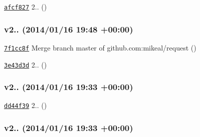 \begin{DoxyItemize}
\item \href{https://github.com/mikeal/request/commit/afcf827559b3223c96ac1bbd19bd1e4a6d7771e3}{\tt afcf827} 2.. ()
\end{DoxyItemize}

\subsubsection*{v2.. (2014/01/16 19\+:48 +00\+:00)}


\begin{DoxyItemize}
\item \href{https://github.com/mikeal/request/commit/7f1cc8ff5a8d9443e7a793f4655487e722b75b0d}{\tt 7f1cc8f} Merge branch \textquotesingle{}master\textquotesingle{} of github.\+com\+:mikeal/request ()
\item \href{https://github.com/mikeal/request/commit/3e43d3d5175f5f18d1e97b2f5d4ca6ac6c216e4a}{\tt 3e43d3d} 2.. ()
\end{DoxyItemize}

\subsubsection*{v2.. (2014/01/16 19\+:33 +00\+:00)}


\begin{DoxyItemize}
\item \href{https://github.com/mikeal/request/commit/dd44f39d37daacbbeb21f9e960f13adbb44eea0a}{\tt dd44f39} 2.. ()
\end{DoxyItemize}

\subsubsection*{v2.. (2014/01/16 19\+:33 +00\+:00)}


